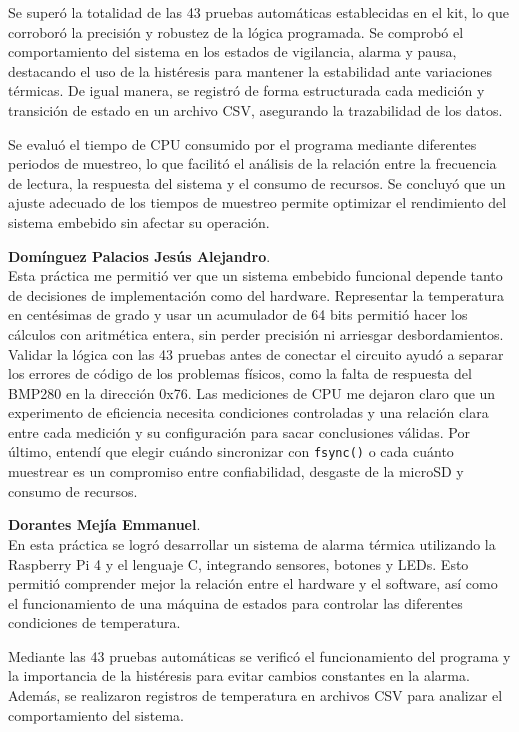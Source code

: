 \documentclass[conference]{IEEEtran}
\begin{document}
Se superó la totalidad de las 43 pruebas automáticas establecidas en el kit, lo que corroboró la precisión y robustez de la lógica programada. Se comprobó el comportamiento del sistema en los estados de vigilancia, alarma y pausa, destacando el uso de la histéresis para mantener la estabilidad ante variaciones térmicas. De igual manera, se registró de forma estructurada cada medición y transición de estado en un archivo CSV, asegurando la trazabilidad de los datos.

Se evaluó el tiempo de CPU consumido por el programa mediante diferentes periodos de muestreo, lo que facilitó el análisis de la relación entre la frecuencia de lectura, la respuesta del sistema y el consumo de recursos. Se concluyó que un ajuste adecuado de los tiempos de muestreo permite optimizar el rendimiento del sistema embebido sin afectar su operación.
\vspace{0.35cm}

\textbf{Domínguez Palacios Jesús Alejandro}.\\
Esta práctica me permitió ver que un sistema embebido funcional depende tanto de decisiones de implementación como del hardware. Representar la temperatura en centésimas de grado y usar un acumulador de 64 bits permitió hacer los cálculos con aritmética entera, sin perder precisión ni arriesgar desbordamientos. Validar la lógica con las 43 pruebas antes de conectar el circuito ayudó a separar los errores de código de los problemas físicos, como la falta de respuesta del BMP280 en la dirección 0x76. Las mediciones de CPU me dejaron claro que un experimento de eficiencia necesita condiciones controladas y una relación clara entre cada medición y su configuración para sacar conclusiones válidas. Por último, entendí que elegir cuándo sincronizar con \texttt{fsync()} o cada cuánto muestrear es un compromiso entre confiabilidad, desgaste de la microSD y consumo de recursos.

\vspace{0.35cm}

\textbf{Dorantes Mejía Emmanuel}.\\
En esta práctica se logró desarrollar un sistema de alarma térmica utilizando la Raspberry Pi 4 y el lenguaje C, integrando sensores, botones y LEDs. Esto permitió comprender mejor la relación entre el hardware y el software, así como el funcionamiento de una máquina de estados para controlar las diferentes condiciones de temperatura.

Mediante las 43 pruebas automáticas se verificó el funcionamiento del programa y la importancia de la histéresis para evitar cambios constantes en la alarma. Además, se realizaron registros de temperatura en archivos CSV para analizar el comportamiento del sistema.
\end{document}
